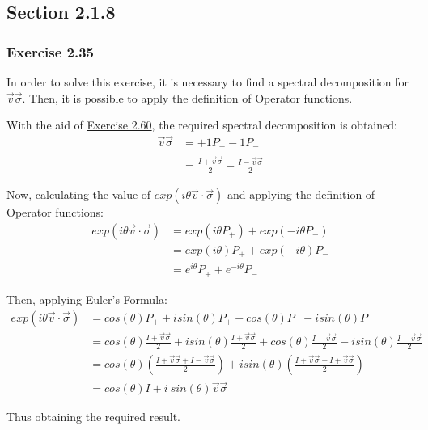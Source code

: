\subsection{Section 2.1.8}
\subsubsection{Exercise 2.35}
\label{sec:nielsen-and-chuang-exercise-2-35}

In order to solve this exercise,
it is necessary to find a spectral decomposition for $\vec{v} \vec{\sigma}$.
Then, it is possible to apply the definition of Operator functions.

With the aid of \hyperref[sec:nielsen-and-chuang-exercise-2-60]{Exercise 2.60},
the required spectral decomposition is obtained:
\begin{align}
    \vec{v}\vec{\sigma} &= +1 P_+ -1 P_- \\
    &= \frac{I + \vec{v}\vec{\sigma}}{2} - \frac{I - \vec{v}\vec{\sigma}}{2}
\end{align}

Now, calculating the value of $exp(i \theta \vec{v}\cdot\vec{\sigma})$
and applying the definition of Operator functions:
\begin{align}
    exp(i \theta \vec{v}\cdot\vec{\sigma}) &=
        exp(i \theta P_+) + exp(-i \theta P_-) \\
    &= exp(i \theta) P_+ + exp(-i \theta) P_- \\
    &= e^{i \theta} P_+ + e^{-i \theta} P_-
\end{align}

Then, applying Euler's Formula:
\begin{align}
    exp(i \theta \vec{v}\cdot\vec{\sigma}) &=
        cos(\theta)P_+ + i sin(\theta)P_+ +
        cos(\theta)P_- - i sin(\theta)P_- \\
    &= cos(\theta)\frac{I + \vec{v}\vec{\sigma}}{2} +
        i sin(\theta)\frac{I + \vec{v}\vec{\sigma}}{2} +
        cos(\theta)\frac{I - \vec{v}\vec{\sigma}}{2} -
        i sin(\theta)\frac{I - \vec{v}\vec{\sigma}}{2} \\
    &= cos(\theta) \left(
            \frac{I + \vec{v}\vec{\sigma} + I - \vec{v}\vec{\sigma}}{2}
        \right)
        + i sin(\theta) \left(
            \frac{I + \vec{v}\vec{\sigma} - I + \vec{v}\vec{\sigma}}{2}
        \right) \\
    &= cos(\theta) I + i\ sin(\theta) \vec{v}\vec{\sigma}
\end{align}

Thus obtaining the required result.